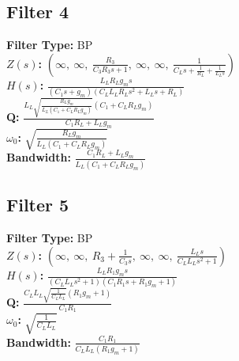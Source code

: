 \documentclass{article}
\begin{document}
\subsection*{Filter 4}
\textbf{Filter Type:} BP \\ 
\textbf{$Z(s)$:} $\left( \infty, \  \infty, \  \frac{R_{3}}{C_{3} R_{3} s + 1}, \  \infty, \  \infty, \  \frac{1}{C_{L} s + \frac{1}{R_{L}} + \frac{1}{L_{L} s}}\right)$ \\ 
\textbf{$H(s)$:} $\frac{L_{L} R_{L} g_{m} s}{\left(C_{1} s + g_{m}\right) \left(C_{L} L_{L} R_{L} s^{2} + L_{L} s + R_{L}\right)}$ \\ 
\textbf{Q:} $\frac{L_{L} \sqrt{\frac{R_{L} g_{m}}{L_{L} \left(C_{1} + C_{L} R_{L} g_{m}\right)}} \left(C_{1} + C_{L} R_{L} g_{m}\right)}{C_{1} R_{L} + L_{L} g_{m}}$ \\ 
\textbf{$\omega_0$:} $\sqrt{\frac{R_{L} g_{m}}{L_{L} \left(C_{1} + C_{L} R_{L} g_{m}\right)}}$ \\ 
\textbf{Bandwidth:} $\frac{C_{1} R_{L} + L_{L} g_{m}}{L_{L} \left(C_{1} + C_{L} R_{L} g_{m}\right)}$ \\ 
\subsection*{Filter 5}
\textbf{Filter Type:} BP \\ 
\textbf{$Z(s)$:} $\left( \infty, \  \infty, \  R_{3} + \frac{1}{C_{3} s}, \  \infty, \  \infty, \  \frac{L_{L} s}{C_{L} L_{L} s^{2} + 1}\right)$ \\ 
\textbf{$H(s)$:} $\frac{L_{L} R_{1} g_{m} s}{\left(C_{L} L_{L} s^{2} + 1\right) \left(C_{1} R_{1} s + R_{1} g_{m} + 1\right)}$ \\ 
\textbf{Q:} $\frac{C_{L} L_{L} \sqrt{\frac{1}{C_{L} L_{L}}} \left(R_{1} g_{m} + 1\right)}{C_{1} R_{1}}$ \\ 
\textbf{$\omega_0$:} $\sqrt{\frac{1}{C_{L} L_{L}}}$ \\ 
\textbf{Bandwidth:} $\frac{C_{1} R_{1}}{C_{L} L_{L} \left(R_{1} g_{m} + 1\right)}$ \\ 
\end{document}

